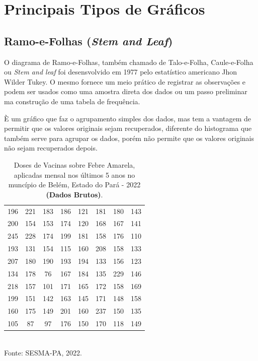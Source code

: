 \newpage
\section{Principais Tipos de Gráficos}

\subsection{Ramo-e-Folhas (\textit{Stem and Leaf})}

O diagrama de Ramo-e-Folhas, também chamado de Talo-e-Folha, Caule-e-Folha ou \textit{Stem and leaf} foi desensvolvido em 1977 pelo estatístico americano Jhon Wilder Tukey. O mesmo fornece um meio prático de registrar as observações e podem ser usados como uma amostra direta dos dados ou um passo preliminar ma construção de uma tabela de frequência.\vst




È um gráfico que faz o agrupamento simples dos dados, mas tem a vantagem de permitir que os valores originais sejam recuperados, diferente do histograma que também serve para agrupar os dados, porém não permite que os valores originais não sejam recuperados depois.\vskip0.3cm



\begin{table}[!htb]
    \centering
    {
\caption{Doses de Vacinas sobre Febre Amarela, aplicadas mensal nos últimos 5 anos no muncípio de Belém, Estado do Pará - 2022 \textbf{(Dados Brutos)}.}
    \label{febreamarela}
    \vspace{0.1cm}
\begin{tabular}{c|c|c|c|c|c|c|c}
  \hline \hline
  196 & 221 & 183 & 186 & 121 & 181 & 180 & 143  \\
  200 & 154 & 153 & 174 & 120 & 168 & 167 & 141  \\
  245 & 228 & 174 & 199 & 181 & 158 & 176 & 110  \\
  193 & 131 & 154 & 115 & 160 & 208 & 158 & 133  \\
  207 & 180 & 190 & 193 & 194 & 133 & 156 & 123  \\
  134 & 178 &  76 & 167 & 184 & 135 & 229 & 146  \\
  218 & 157 & 101 & 171 & 165 & 172 & 158 & 169  \\
  199 & 151 & 142 & 163 & 145 & 171 & 148 & 158  \\
  160 & 175 & 149 & 201 & 160 & 237 & 150 & 135  \\
  105 & 87  & 97  & 176 & 150 & 170 & 118 & 149  \\
\hline \hline
\end{tabular}}
\\
\hspace{-4.0cm} Fonte: SESMA-PA, 2022.
\end{table}



